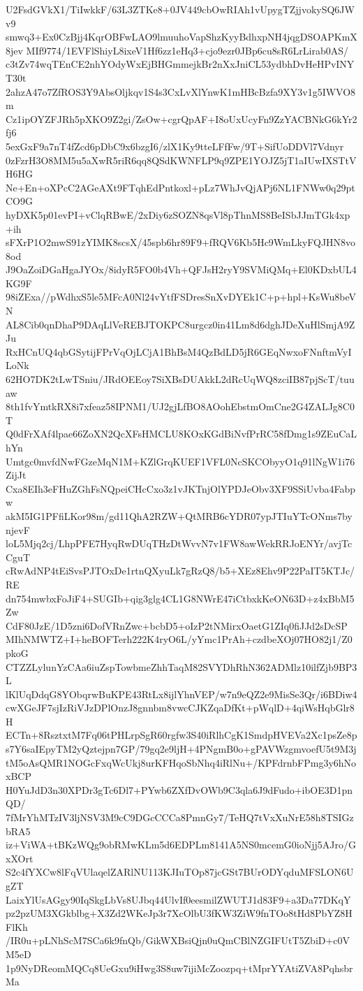 U2FsdGVkX1/TiIwkkF/63L3ZTKe8+0JV449cbOwRIAh1vUpygTZjjvokySQ6JWv9
smwq3+Ex0CzBjj4KqrOBFwLAO9lmuuhoVapShzKyyBdhxpNH4jqgDSOAPKmX8jev
MIf9774/1EVFlShiyL8ixeV1Hf6zz1eHq3+cjo9ezr0JBp6cu8sR6LrLirab0AS/
c3tZv74wqTEnCE2nhYOdyWxEjBHGmmejkBr2nXxJniCL53ydbhDvHeHPvINYT30t
2ahzA47o7ZfROS3Y9AbsOljkqv1S4s3CxLvXlYnwK1mHBcBzfa9XY3v1g5IWVO8m
Cz1ipOYZFJRh5pXKO9Z2gi/ZsOw+cgrQpAF+I8oUxUcyFn9ZzYACBNkG6kYr2fj6
5exGxF9a7nT4fZcd6pDbC9x6bzgI6/zlX1Ky9tteLFfFw/9T+SifUoDDVl7Vdnyr
0zFzrH3O8MM5u5aXwR5riR6qq8QSdKWNFLP9q9ZPE1YOJZ5jT1aIUwIXSTtVH6HG
Ne+En+oXPcC2AGeAXt9FTqhEdPntkoxl+pLz7WhJvQjAPj6NL1FNWw0q29ptCO9G
hyDXK5p01evPI+vClqRBwE/2xDiy6zSOZN8qsVl8pThnMS8BeISbJJmTGk4xp+ih
sFXrP1O2mwS91zYIMK8scsX/45spb6hr89F9+fRQV6Kb5Hc9WmLkyFQJHN8vo8od
J9OaZoiDGaHgaJYOx/8idyR5FO0b4Vh+QFJsH2ryY9SVMiQMq+El0KDxbUL4KG9F
98iZExa//pWdhxS5le5MFcA0Nl24vYtfFSDresSnXvDYEk1C+p+hpl+KsWu8beVN
AL8Cib0qnDhaP9DAqLlVeREBJTOKPC8urgcz0in41Lm8d6dghJDeXuHlSmjA9ZJu
RxHCnUQ4qbGSytijFPrVqOjLCjA1BhBsM4QzBdLD5jR6GEqNwxoFNnftmVyILoNk
62HO7DK2tLwTSniu/JRdOEEoy7SiXBsDUAkkL2dRcUqWQ8zciIB87pjScT/tuuaw
8th1fvYmtkRX8i7xfeaz58IPNM1/UJ2gjLfBO8AOohEbstmOmCne2G4ZALJg8C0T
Q0dFrXAf4lpae66ZoXN2QcXFsHMCLU8KOxKGdBiNvfPrRC58fDmg1s9ZEuCaLhYn
Umtgc0mvfdNwFGzeMqN1M+KZlGrqKUEF1VFL0NcSKCObyyO1q91lNgW1i76ZijJt
Cxa8EIh3eFHuZGhFsNQpeiCHcCxo3z1vJKTnjOlYPDJeObv3XF9SSiUvba4Fabpw
akM5IG1PFfiLKor98m/gd11QhA2RZW+QtMRB6cYDR07ypJTIuYTcONms7bynjevF
loL5Mjq2cj/LhpPFE7HyqRwDUqTHzDtWvvN7v1FW8awWekRRJoENYr/avjTcCguT
cRwAdNP4tEiSvsPJTOxDe1rtnQXyuLk7gRzQ8/b5+XEz8Ehv9P22PaIT5KTJc/RE
dn754mwbxFoJiF4+SUGIb+qig3glg4CL1G8NWrE47iCtbxkKeON63D+z4xBbM5Zw
CdF80JzE/1D5zni6DofVRnZwc+bcbD5+oIzP2tNMirxOaetG1ZIq0fiJJd2sDcSP
MIhNMWTZ+I+heBOFTerh222K4ryO6L/yYmc1PrAh+czdbeXOj07HO82j1/Z0pkoG
CTZZLylunYzCAa6iuZspTowbmeZhhTaqM82SVYDhRhN362ADMlz10ilfZjb9BP3L
lKlUqDdqG8YObqrwBuKPE43RtLx8ijlYhnVEP/w7n9eQZ2e9MisSe3Qr/i6BDiw4
cwXGeJF7sjIzRiVJzDPlOnzJ8gnnbm8vwcCJKZqaDfKt+pWqlD+4qiWsHqbGlr8H
ECTn+8RsztxtM7Fq06tPHLrpSgR60rgfw3S40iRlhCgK1SmdpHVEVa2Xc1psZe8p
s7Y6saIEpyTM2yQztejpn7GP/79gq2e9ljH+4PNgmB0o+gPAVWzgmvoefU5t9M3j
tM5oAsQMR1NOGcFxqWcUkj8urKFHqoSbNhq4iRlNu+/KPFdrnbFPmg3y6hNoxBCP
H0YuJdD3n30XPDr3gTc6Dl7+PYwb6ZXfDvOWb9C3qla6J9dFudo+ibOE3D1pnQD/
7fMrYhMTzIV3ljNSV3M9cC9DGcCCCa8PmnGy7/TeHQ7tVxXuNrE58h8TSIGzbRA5
iz+ViWA+tBKzWQg9obRMwKLm5d6EDPLm8141A5NS0mcemG0ioNjj5AJro/GxXOrt
S2c4fYXCw8lFqVUlaqelZARlNU113KJIuTOp87jcGSt7BUrODYqduMFSLON6UgZT
LaixYlUsAGgy90IqSkgLbVs8UJbq44UlvIf0eesmilZWUTJ1d83F9+a3Da77DKqY
pz2pzUM3XGkblbg+X3Zd2WKeJp3r7XcOlbU3fKW3ZiW9fnTOo8tHd8PbYZ8HFlKh
/IR0u+pLNhScM7SCa6k9fnQb/GikWXBsiQjn0uQmCBlNZGIFUtT5ZbiD+c0VM5eD
1p9NyDReomMQCq8UeGxu9iHwg3S8uw7ijiMcZoozpq+tMprYYAtiZVA8PqhsbrMa
